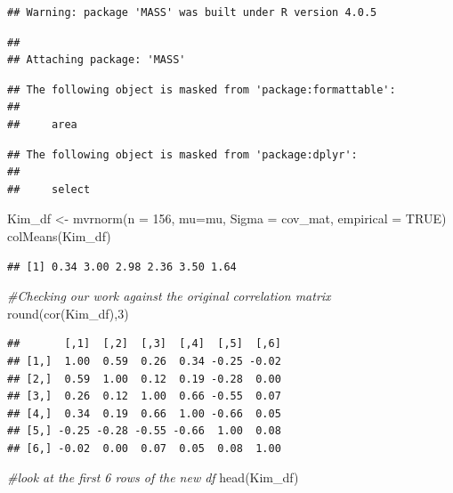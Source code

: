 \documentclass[
  english,
]{book}
\newenvironment{Shaded}{\begin{snugshade}}{\end{snugshade}}
\newcommand{\AttributeTok}[1]{\textcolor[rgb]{0.77,0.63,0.00}{#1}}
\newcommand{\CommentTok}[1]{\textcolor[rgb]{0.56,0.35,0.01}{\textit{#1}}}
\newcommand{\ConstantTok}[1]{\textcolor[rgb]{0.00,0.00,0.00}{#1}}
\newcommand{\DecValTok}[1]{\textcolor[rgb]{0.00,0.00,0.81}{#1}}
\newcommand{\FunctionTok}[1]{\textcolor[rgb]{0.00,0.00,0.00}{#1}}
\newcommand{\NormalTok}[1]{#1}
\newcommand{\OtherTok}[1]{\textcolor[rgb]{0.56,0.35,0.01}{#1}}
\begin{document}
\begin{verbatim}
## Warning: package 'MASS' was built under R version 4.0.5
\end{verbatim}

\begin{verbatim}
## 
## Attaching package: 'MASS'
\end{verbatim}

\begin{verbatim}
## The following object is masked from 'package:formattable':
## 
##     area
\end{verbatim}

\begin{verbatim}
## The following object is masked from 'package:dplyr':
## 
##     select
\end{verbatim}

\begin{Shaded}
\begin{Highlighting}[]
\NormalTok{Kim\_df }\OtherTok{\textless{}{-}} \FunctionTok{mvrnorm}\NormalTok{(}\AttributeTok{n =} \DecValTok{156}\NormalTok{, }\AttributeTok{mu=}\NormalTok{mu, }\AttributeTok{Sigma =}\NormalTok{ cov\_mat, }\AttributeTok{empirical =} \ConstantTok{TRUE}\NormalTok{)}
\FunctionTok{colMeans}\NormalTok{(Kim\_df)}
\end{Highlighting}
\end{Shaded}

\begin{verbatim}
## [1] 0.34 3.00 2.98 2.36 3.50 1.64
\end{verbatim}

\begin{Shaded}
\begin{Highlighting}[]
\CommentTok{\#Checking our work against the original correlation matrix}
\FunctionTok{round}\NormalTok{(}\FunctionTok{cor}\NormalTok{(Kim\_df),}\DecValTok{3}\NormalTok{)}
\end{Highlighting}
\end{Shaded}

\begin{verbatim}
##       [,1]  [,2]  [,3]  [,4]  [,5]  [,6]
## [1,]  1.00  0.59  0.26  0.34 -0.25 -0.02
## [2,]  0.59  1.00  0.12  0.19 -0.28  0.00
## [3,]  0.26  0.12  1.00  0.66 -0.55  0.07
## [4,]  0.34  0.19  0.66  1.00 -0.66  0.05
## [5,] -0.25 -0.28 -0.55 -0.66  1.00  0.08
## [6,] -0.02  0.00  0.07  0.05  0.08  1.00
\end{verbatim}

\begin{Shaded}
\begin{Highlighting}[]
\CommentTok{\#look at the first 6 rows of the new df}
\FunctionTok{head}\NormalTok{(Kim\_df)}
\end{Highlighting}
\end{Shaded}
\end{document}
